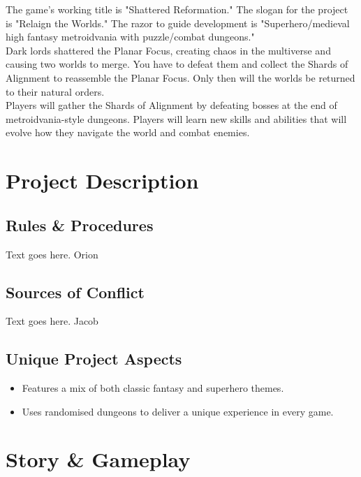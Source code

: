 \documentclass[titlepage]{article}
\begin{document}
The game's working title is "Shattered Reformation." The slogan for the project
is "Relaign the Worlds." The razor to guide development is "Superhero/medieval
high fantasy metroidvania with puzzle/combat dungeons." \\

Dark lords shattered the Planar Focus, creating chaos in the multiverse and
causing two worlds to merge. You have to defeat them and collect the Shards of
Alignment to reassemble the Planar Focus. Only then will the worlds be returned
to their natural orders. \\

Players will gather the Shards of Alignment by defeating bosses at the end of
metroidvania-style dungeons. Players will learn new skills and abilities that
will evolve how they navigate the world and combat enemies. 

\section{Project Description}

\subsection{Rules \& Procedures}
Text goes here. Orion

\subsection{Sources of Conflict}
Text goes here. Jacob

\subsection{Unique Project Aspects}
\begin{itemize}
	\item Features a mix of both classic fantasy and superhero themes.
	\item Uses randomised dungeons to deliver a unique experience in every game.
\end{itemize}

\section{Story \& Gameplay}
\end{document}
